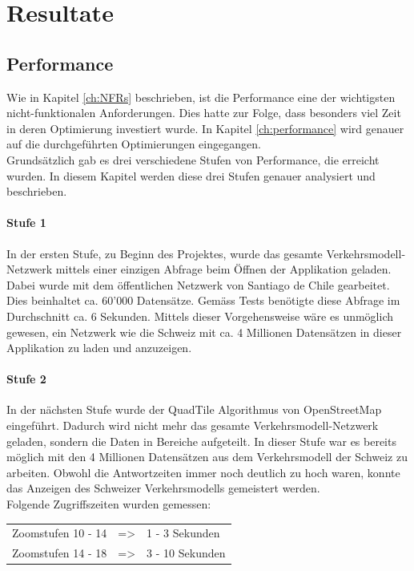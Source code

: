 \chapter{Resultate}
\section{Performance}
Wie in Kapitel \ref{ch:NFRs}  beschrieben, ist die Performance eine der wichtigsten nicht-funktionalen Anforderungen. Dies hatte zur Folge, dass besonders viel Zeit in deren Optimierung investiert wurde. In Kapitel \ref{ch:performance}  wird genauer auf die durchgeführten Optimierungen eingegangen.\\
Grundsätzlich gab es drei verschiedene Stufen von Performance, die erreicht wurden. In diesem Kapitel werden diese drei Stufen genauer analysiert und beschrieben.
\subsubsection*{Stufe 1}
In der ersten Stufe, zu Beginn des Projektes, wurde das gesamte Verkehrsmodell-Netzwerk mittels einer einzigen Abfrage beim Öffnen der Applikation geladen. Dabei wurde mit dem öffentlichen Netzwerk von Santiago de Chile gearbeitet. Dies beinhaltet ca. 60'000 Datensätze. Gemäss Tests benötigte diese Abfrage im Durchschnitt ca. 6 Sekunden. Mittels dieser Vorgehensweise wäre es unmöglich gewesen, ein Netzwerk wie die Schweiz mit ca. 4 Millionen Datensätzen in dieser Applikation zu laden und anzuzeigen.
\subsubsection*{Stufe 2}
In der nächsten Stufe wurde der QuadTile Algorithmus von OpenStreetMap eingeführt. Dadurch wird nicht mehr das gesamte Verkehrsmodell-Netzwerk geladen, sondern die Daten in Bereiche aufgeteilt. In dieser Stufe war es bereits möglich mit den 4 Millionen Datensätzen aus dem Verkehrsmodell der Schweiz zu arbeiten. Obwohl die Antwortzeiten immer noch deutlich zu hoch waren, konnte das Anzeigen des Schweizer Verkehrsmodells gemeistert werden.\\
Folgende Zugriffszeiten wurden gemessen:\\[0.3cm]
\begin{tabular}{ l c l}
Zoomstufen 10 - 14 & => & 1 - 3 Sekunden \\
Zoomstufen 14 - 18 & => & 3 - 10 Sekunden \\ 
\end{tabular} 
